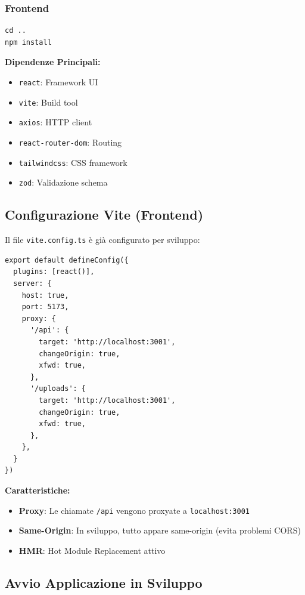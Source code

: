 \documentclass[11pt,a4paper]{article}
\newcommand{\code}[1]{\texttt{#1}}
\begin{document}
\subsubsection{Frontend}

\begin{lstlisting}[caption=Installazione Dipendenze Frontend]
cd ..
npm install
\end{lstlisting}

\textbf{Dipendenze Principali:}
\begin{itemize}
    \item \code{react}: Framework UI
    \item \code{vite}: Build tool
    \item \code{axios}: HTTP client
    \item \code{react-router-dom}: Routing
    \item \code{tailwindcss}: CSS framework
    \item \code{zod}: Validazione schema
\end{itemize}

\subsection{Configurazione Vite (Frontend)}

Il file \code{vite.config.ts} è già configurato per sviluppo:

\begin{lstlisting}[caption=vite.config.ts]
export default defineConfig({
  plugins: [react()],
  server: {
    host: true,
    port: 5173,
    proxy: {
      '/api': {
        target: 'http://localhost:3001',
        changeOrigin: true,
        xfwd: true,
      },
      '/uploads': {
        target: 'http://localhost:3001',
        changeOrigin: true,
        xfwd: true,
      },
    },
  }
})
\end{lstlisting}

\textbf{Caratteristiche:}
\begin{itemize}
    \item \textbf{Proxy}: Le chiamate \code{/api} vengono proxyate a \code{localhost:3001}
    \item \textbf{Same-Origin}: In sviluppo, tutto appare same-origin (evita problemi CORS)
    \item \textbf{HMR}: Hot Module Replacement attivo
\end{itemize}

\subsection{Avvio Applicazione in Sviluppo}
\end{document}
